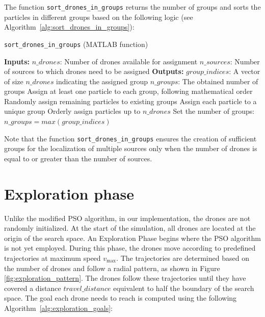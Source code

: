 \par The function \texttt{sort\_drones\_in\_groups} returns the number of groups and sorts the 
particles in different groups based on the following logic (see Algorithm~\ref{alg:sort_drones_in_groups}):
\begin{algorithm}[H]
    \caption{\texttt{sort\_drones\_in\_groups} (MATLAB function)}\label{alg:sort_drones_in_groups}
    \begin{algorithmic}[1]
    \State \textbf{Inputs:}
    \State $n\_drones$: Number of drones available for assignment
    \State $n\_sources$: Number of sources to which drones need to be assigned
    \State \textbf{Outputs:}
    \State $group\_indices$: A vector of size $n\_drones$ indicating the assigned group
    \State $n\_groups$: The obtained number of groups
        \State Assign at least one particle to each group, following mathematical order
        \State Randomly assign remaining particles to existing groups
        \State Assign each particle to a unique group
    \Else
        \State Orderly assign particles up to $n\_drones$
    \EndIf
    \State Set the number of groups: $n\_groups = max(group\_indices)$
    \end{algorithmic}
\end{algorithm}

\par Note that the function \texttt{sort\_drones\_in\_groups} ensures the creation of sufficient groups 
for the localization of multiple sources only when the number of drones is equal to or greater than 
the number of sources.

\section{Exploration phase}
\par Unlike the modified PSO algorithm, in our implementation, the drones are not randomly initialized. 
At the start of the simulation, all drones are located at the origin of the search space. 
An Exploration Phase begins where the PSO algorithm is not yet employed. 
During this phase, the drones move according to predefined trajectories at maximum speed $v_{\text{max}}$. 
The trajectories are determined based on the number of drones and follow a radial pattern, as shown in Figure \ref{fig:exploration_pattern}. 
The drones follow these trajectories until they have covered a distance $travel\_distance$ equivalent to half the boundary of the search space.
The goal each drone needs to reach is computed using the following Algorithm~\ref{alg:exploration_goals}:

